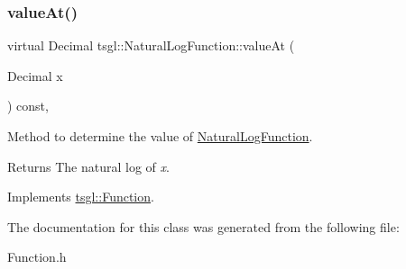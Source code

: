 \subsubsection{\texorpdfstring{value\+At()}{valueAt()}}
{\footnotesize\ttfamily virtual Decimal tsgl\+::\+Natural\+Log\+Function\+::value\+At (\begin{DoxyParamCaption}\item[{Decimal}]{x }\end{DoxyParamCaption}) const\hspace{0.3cm}{\ttfamily [inline]}, {\ttfamily [virtual]}}



Method to determine the value of \hyperlink{classtsgl_1_1_natural_log_function}{Natural\+Log\+Function}. 

\begin{DoxyReturn}{Returns}
The natural log of {\itshape x}. 
\end{DoxyReturn}


Implements \hyperlink{classtsgl_1_1_function_affb7b3b19a04efefa29a9870d666e912}{tsgl\+::\+Function}.



The documentation for this class was generated from the following file\+:\begin{DoxyCompactItemize}
\item 
Function.\+h\end{DoxyCompactItemize}
